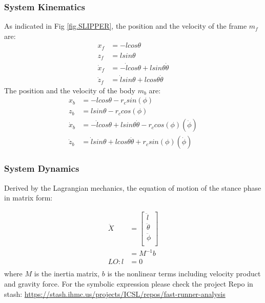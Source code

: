 \subsubsection{System Kinematics}
As indicated in Fig \ref{fig.SLIPPER}, the position 
and the velocity of the frame $m_f$ are:
\begin{align*}
x_f &= -lcos\theta \\
z_f &= lsin\theta \\
	\dot x_f &= -\dot lcos\theta + lsin\theta\dot \theta \\
\dot z_f &= \dot lsin\theta + lcos\theta \dot{\theta}
\end{align*}
The position 
and the velocity of the body $m_b$ are:
\begin{align*}
x_b &= -lcos\theta - r_csin(\phi)\\
z_b &= lsin\theta - r_ccos(\phi)\\
\dot x_b &= -\dot lcos\theta +lsin\theta\dot \theta -  r_ccos(\phi)(\dot\phi)\\
\dot z_b &= \dot lsin\theta + lcos\theta \dot{\theta} + r_csin(\phi)(\dot\phi)\
\end{align*}


\subsubsection{System Dynamics}


Derived by the Lagrangian mechanics, the equation of motion of the stance phase in matrix form:

\begin{align}
\label{eq:EOM_SLIPP}
\nonumber \ddot X &= 
\begin{bmatrix}
\ddot l  \\
\ddot \theta\\
\ddot \phi  \\
\end{bmatrix} \\ &= M^{-1} b\\
LO: l&=0\\
\end{align}
where $M$ is the inertia matrix, $b$ is the nonlinear terms including velocity product and gravity force. For the symbolic expression please check the project Repo in stash:
\href{https://stash.ihmc.us/projects/ICSL/repos/fast-runner-analysis}{https://stash.ihmc.us/projects/ICSL/repos/fast-runner-analysis}\\

